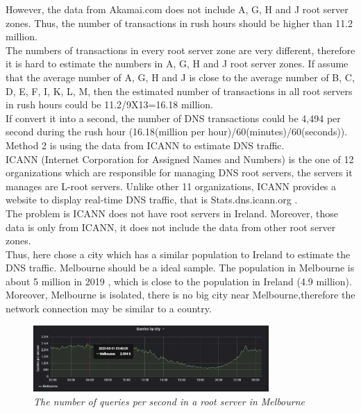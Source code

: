 However, the data from Akamai.com does not include A, G, H and J root server zones. Thus, the number of transactions in rush hours should be higher than 11.2 million.
\\

The numbers of transactions in every root server zone are very different, therefore it is hard to estimate the numbers in A, G, H and J root server zones. If assume that the average number of A, G, H and J is close to the average number of B, C, D, E, F, I, K, L, M, then the estimated number of transactions in all root servers in rush hours could be 11.2/9X13=16.18 million.
\\

If convert it into a second, the number of DNS transactions could be 4,494 per second during the rush hour (16.18(million per hour)/60(minutes)/60(seconds)).
\\

Method 2 is using the data from ICANN to estimate DNS traffic. 
\\

ICANN (Internet Corporation for Assigned Names and Numbers) is the one of 12 organizations which are responsible for managing DNS root servers, the servers it manages are L-root servers. Unlike other 11 organizations, ICANN provides a website to display real-time DNS traffic, that is Stats.dns.icann.org \cite{stats_dns_icann_org}.
\\

The problem is ICANN does not have root servers in Ireland. Moreover, those data is only from ICANN, it does not include the data from other root server zones.
\\

Thus, here chose a city which has a similar population to Ireland to estimate the DNS traffic. Melbourne should be a ideal sample. The population in Melbourne is about 5 million in 2019 \cite{Melbourne_wiki}, which is close to the population in Ireland (4.9 million). Moreover, Melbourne is isolated, there is no big city near Melbourne,therefore the network connection may be similar to a country.
\\

\begin{figure}[hbt!]
    \centering
    \includegraphics[width=0.8\textwidth]{figure/melbourne.jpg}
    \caption{\em The number of queries per second in a root server in Melbourne \cite{stats_dns_icann_org} }
    \label{tab:figure_melbourne}
\end{figure}

